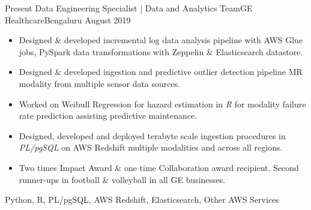 


\begin{experiences}
  \experience
    {Present} {Data Engineering Specialist | Data and Analytics Team}{GE Healthcare}{Bengaluru}
    {August 2019}    {
                      \begin{itemize}
                        
                        \item{Designed \& developed incremental log data analysis pipeline with AWS Glue jobs, PySpark data transformations with Zeppelin \& Elasticsearch datastore.}
                        \item{Designed \& developed ingestion and predictive outlier detection pipeline MR modality from multiple sensor data sources.}
                        \item {Worked on Weibull Regression for hazard estimation in \textit{R} for modality failure rate prediction assisting predictive maintenance.}
                        \item {Designed, developed and deployed terabyte scale ingestion procedures in \textit{PL/pgSQL} on AWS Redshift multiple modalities and across all regions.}
                        \item {Two times Impact Award \& one time Collaboration award recipient. Second runner-ups in football \& volleyball in all GE businesses.}
                      \end{itemize}
                    }
                    {Python, R, PL/pgSQL, AWS Redshift, Elasticsearch, Other AWS Services}
  \emptySeparator
  
  \iffalse
  \experience
    {August 2014} {Study Year Gap | Multiple Competitive Exam Preparation}{XXX Test Cleared}{Bengaluru}
    {August 2013}    {
                      \begin{itemize}
                        
                        \item{Gave X exam score Y result. Present in top X\% of students.}
                        \item{Gave X exam score Y result. Present in top X\% of students.}
                      \end{itemize}
                    }
                    {Advanced Calculus, Differential Equations, Linear Algebra, General Knowledge}
  \emptySeparator
  \fi
  

\end{experiences}
